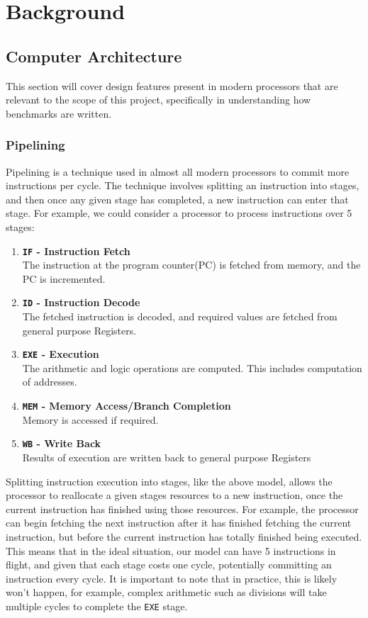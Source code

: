 \documentclass[bsc,frontabs,twoside,singlespacing,parskip,deptreport]{infthesis}     %
\begin{document}
\chapter{Background}\label{chap:bground}
\section{Computer Architecture}
This section will cover design features present in modern processors that are relevant to the scope of this project, specifically in understanding how benchmarks are written.

\subsection{Pipelining}
Pipelining is a technique used in almost all modern processors to commit more instructions per cycle. The technique involves splitting an instruction into stages, and then once any given stage has completed, a new instruction can enter that stage. For example, we could consider a processor to process instructions over 5 stages:
\begin{enumerate}
    \item{{\bf \texttt{IF} - Instruction Fetch} \\ The instruction at the program counter(PC) is fetched from memory, and the PC is incremented.}
    \item{{\bf \texttt{ID} - Instruction Decode} \\ The fetched instruction is decoded, and required values are fetched from general purpose Registers.}
    \item{{\bf \texttt{EXE} - Execution} \\ The arithmetic and logic operations are computed. This includes computation of addresses. }
    \item{{\bf \texttt{MEM} - Memory Access/Branch Completion} \\ Memory is accessed if required.}
    \item{{\bf \texttt{WB} - Write Back} \\ Results of execution are written back to general purpose Registers}
\end{enumerate}
Splitting instruction execution into stages, like the above model, allows the processor to reallocate a given stages resources to a new instruction, once the current instruction has finished using those resources. For example, the processor can begin fetching the next instruction after it has finished fetching the current instruction, but before the current instruction has totally finished being executed. This means that in the ideal situation, our model can have 5 instructions in flight, and given that each stage costs one cycle, potentially committing an instruction every cycle. It is important to note that in practice, this is likely won't happen, for example, complex arithmetic such as divisions will take multiple cycles to complete the \texttt{EXE} stage.
\end{document}

